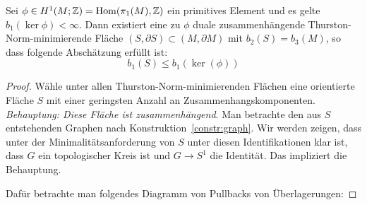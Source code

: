 \begin{lem}
	\label{lem:minS}
	Sei $\phi \in H^1(M;\mathbb{Z})= \operatorname{Hom} (\pi_1(M),\mathbb{Z})$ ein primitives Element und es gelte $b_1(\ker\phi)<\infty$. Dann existiert eine zu $\phi$ duale zusammenhängende Thurston-Norm-minimierende Fläche $(S,\partial S) \subset (M,\partial M)$ mit $b_2(S)=b_3(M)$, so dass folgende Abschätzung erfüllt ist:
	\[
	b_1(S) \leq b_1(\ker(\phi))
	\]
\end{lem}
\begin{proof}
	Wähle unter allen Thurston-Norm-minimierenden Flächen eine orientierte Fläche $S$ mit einer geringsten Anzahl an Zusammenhangskomponenten.\\
	\textit{Behauptung: Diese Fläche ist zusammenhängend}.
	Man betrachte den aus $S$ entstehenden Graphen nach Konstruktion~\ref{constr:graph}.
	Wir werden zeigen, dass unter der Minimalitätsanforderung von $S$ unter diesen Identifikationen klar ist, dass $G$ ein topologischer Kreis ist und $G\to S^1$ die Identität. Das impliziert die Behauptung.

	Dafür betrachte man folgendes Diagramm von Pullbacks von Überlagerungen:


\end{proof}
